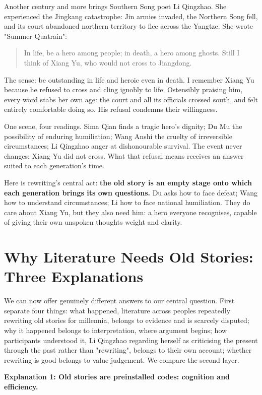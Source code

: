 Another century and more brings Southern Song poet Li Qingzhao. She experienced the Jingkang catastrophe: Jin armies invaded, the Northern Song fell, and its court abandoned northern territory to flee across the Yangtze. She wrote "Summer Quatrain":

\begin{quote}
In life, be a hero among people; in death, a hero among ghosts. Still I think of Xiang Yu, who would not cross to Jiangdong.
\end{quote}
The sense: be outstanding in life and heroic even in death. I remember Xiang Yu because he refused to cross and cling ignobly to life. Ostensibly praising him, every word stabs her own age: the court and all its officials crossed south, and felt entirely comfortable doing so. His refusal condemns their willingness.

One scene, four readings. Sima Qian finds a tragic hero's dignity; Du Mu the possibility of enduring humiliation; Wang Anshi the cruelty of irreversible circumstances; Li Qingzhao anger at dishonourable survival. The event never changes: Xiang Yu did not cross. What that refusal means receives an answer suited to each generation's time.

Here is rewriting's central act: \textbf{the old story is an empty stage onto which each generation brings its own questions.} Du asks how to face defeat; Wang how to understand circumstances; Li how to face national humiliation. They do care about Xiang Yu, but they also need him: a hero everyone recognises, capable of giving their own unspoken thoughts weight and clarity.

\section[Why Old Stories Persist: Three Accounts]{Why Literature Needs Old Stories: Three Explanations}
We can now offer genuinely different answers to our central question. First separate four things: what happened, literature across peoples repeatedly rewriting old stories for millennia, belongs to evidence and is scarcely disputed; why it happened belongs to interpretation, where argument begins; how participants understood it, Li Qingzhao regarding herself as criticising the present through the past rather than "rewriting", belongs to their own account; whether rewriting is good belongs to value judgement. We compare the second layer.

\textbf{Explanation 1: Old stories are preinstalled codes: cognition and efficiency.}

